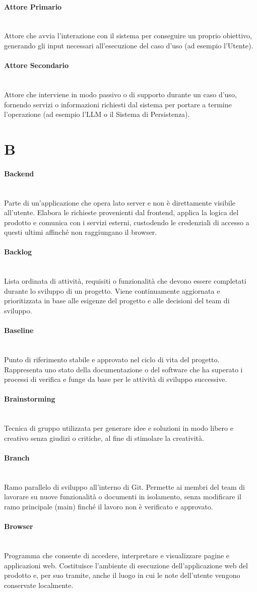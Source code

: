 \documentclass[a4paper, 10pt, colorlinks=true, linkcolor=black, urlcolor=blue, citecolor=blue, hidelinks]{article}
\newcommand{\glossaryterm}[2]{
    \paragraph{#1 \label{term:#1}} \mbox{} \\
    #2
    \vspace{0.5em}
}
\begin{document}
\glossaryterm{Attore Primario}{Attore che avvia l'interazione con il sistema per conseguire un proprio obiettivo, generando gli input necessari all'esecuzione del caso d'uso (ad esempio l'Utente).}

\glossaryterm{Attore Secondario}{Attore che interviene in modo passivo o di supporto durante un caso d'uso, fornendo servizi o informazioni richiesti dal sistema per portare a termine l'operazione (ad esempio l'LLM o il Sistema di Persistenza).}

\newpage

\section*{B}

\glossaryterm{Backend}{Parte di un'applicazione che opera lato server e non è direttamente visibile all'utente. Elabora le richieste provenienti dal frontend, applica la logica del prodotto e comunica con i servizi esterni, custodendo le credenziali di accesso a questi ultimi affinché non raggiungano il browser.}

\glossaryterm{Backlog}{Lista ordinata di attività, requisiti o funzionalità che devono essere completati durante lo sviluppo di un progetto. Viene continuamente aggiornata e prioritizzata in base alle esigenze del progetto e alle decisioni del team di sviluppo.}

\glossaryterm{Baseline}{Punto di riferimento stabile e approvato nel ciclo di vita del progetto. Rappresenta uno stato della documentazione o del software che ha superato i processi di verifica e funge da base per le attività di sviluppo successive.}

\glossaryterm{Brainstorming}{Tecnica di gruppo utilizzata per generare idee e soluzioni in modo libero e creativo senza giudizi o critiche, al fine di stimolare la creatività.}

\glossaryterm{Branch}{Ramo parallelo di sviluppo all'interno di Git. Permette ai membri del team di lavorare su nuove funzionalità o documenti in isolamento, senza modificare il ramo principale (main) finché il lavoro non è verificato e approvato.}

\glossaryterm{Browser}{Programma che consente di accedere, interpretare e visualizzare pagine e applicazioni web. Costituisce l'ambiente di esecuzione dell'applicazione web del prodotto e, per suo tramite, anche il luogo in cui le note dell'utente vengono conservate localmente.}
\end{document}
